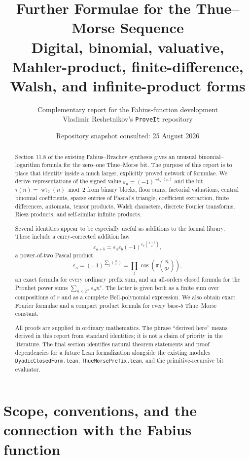 \documentclass[11pt,oneside]{article}
\title{\bfseries Further Formulae for the Thue--Morse Sequence\\[0.35em]
\large Digital, binomial, valuative, Mahler-product, finite-difference, Walsh, and infinite-product forms}
\author{Complementary report for the Fabius-function development\\
\small Vladimir Reshetnikov's \texttt{ProveIt} repository}
\date{Repository snapshot consulted: 25 August 2026}
\theoremstyle{definition}
\theoremstyle{remark}
\newcommand{\wt}{\operatorname{wt}_2}
\newcommand{\vtwo}{v_2}
\begin{document}
\maketitle

\begin{abstract}
Section 11.8 of the existing Fabius--Rvachev synthesis gives an unusual
binomial--logarithm formula for the zero--one Thue--Morse bit.  The purpose of
this report is to place that identity inside a much larger, explicitly proved
network of formulae.  We derive representations of the signed value
\(\varepsilon_n=(-1)^{\wt(n)}\) and the bit
\(\tau(n)=\wt(n)\bmod 2\) from binary blocks, floor sums, factorial
valuations, central binomial coefficients, sparse entries of Pascal's
triangle, coefficient extraction, finite differences, automata, tensor
products, Walsh characters, discrete Fourier transforms, Riesz products, and
self-similar infinite products.

Several identities appear to be especially useful as additions to the formal
library.  These include a carry-corrected addition law
\[
 \varepsilon_{a+b}=\varepsilon_a\varepsilon_b
 (-1)^{\vtwo\binom{a+b}{a}},
\]
a power-of-two Pascal product
\[
 \varepsilon_n=(-1)^{\sum_j\binom{n}{2^j}}
 =\prod_j\cos\!\left(\pi\binom{n}{2^j}\right),
\]
an exact formula for every ordinary prefix sum, and an all-orders closed
formula for the Prouhet power sums
\(\sum_{n<2^m}\varepsilon_n n^r\).  The latter is given both as a finite sum
over compositions of \(r\) and as a complete Bell-polynomial expression.
We also obtain exact Fourier formulae and a compact product formula for every
base-\(b\) Thue--Morse constant.

All proofs are supplied in ordinary mathematics.  The phrase ``derived here''
means derived in this report from standard identities; it is not a claim of
priority in the literature.  The final section identifies natural theorem
statements and proof dependencies for a future Lean formalization alongside
the existing modules \texttt{DyadicClosedForm.lean},
\texttt{ThueMorsePrefix.lean}, and the primitive-recursive bit evaluator.
\end{abstract}

\tableofcontents
\newpage

\section{Scope, conventions, and the connection with the Fabius function}
\label{sec:scope}
\end{document}
